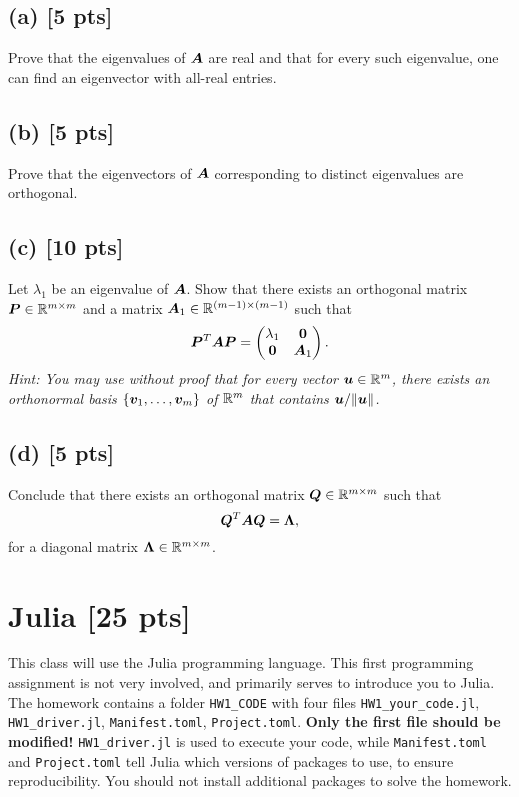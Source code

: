 \documentclass[twoside,10pt]{article}
\begin{document}
\subsection*{(a) [5 pts]}
Prove that the eigenvalues of $\bm{A}$ are real and that for every such eigenvalue, one can find an eigenvector with all-real entries.

\subsection*{(b) [5 pts]}
Prove that the eigenvectors of $\bm{A}$ corresponding to distinct eigenvalues are orthogonal.

\subsection*{(c) [10 pts]}
Let $\lambda_1$ be an eigenvalue of $\bm{A}$. 
Show that there exists an orthogonal matrix $\bm{P} \in \mathbb{R}^{m \times m}$ and a matrix $\bm{A}_1 \in \mathbb{R}^{(m - 1) \times (m - 1)}$ such that 
\begin{equation}
  \bm{P}^T \bm{A} \bm{P} = \begin{pmatrix} \lambda_1 & \bm{0} \\ \bm{0} & \bm{A}_1 \end{pmatrix}.
\end{equation}
\emph{Hint: You may use without proof that for every vector $\bm{u} \in \mathbb{R}^m$, there exists an orthonormal basis $\{\bm{v}_1, \dots, \bm{v}_m\}$ of $\mathbb{R}^m$ that contains $\bm{u} / \|\bm{u}\|$.}

\subsection*{(d) [5 pts]}
Conclude that there exists an orthogonal matrix $\bm{Q} \in \mathbb{R}^{m \times m}$ such that 
\begin{equation}
  \bm{Q}^T \bm{A} \bm{Q} = \bm{\Lambda},
\end{equation}
for a diagonal matrix $\bm{\Lambda} \in \mathbb{R}^{m \times m}$.



\section{Julia [25 pts]}

This class will use the Julia programming language. 
This first programming assignment is not very involved, and primarily serves to introduce you to Julia. 
The homework contains a folder \texttt{HW1\_CODE} with four files \texttt{HW1\_your\_code.jl}, \texttt{HW1\_driver.jl}, \texttt{Manifest.toml}, \texttt{Project.toml}. 
\textbf{Only the first file should be modified!} \texttt{HW1\_driver.jl} is used to execute your code, while \texttt{Manifest.toml} and \texttt{Project.toml} tell Julia which versions of packages to use, to ensure reproducibility. 
You should not install additional packages to solve the homework.
\end{document}
